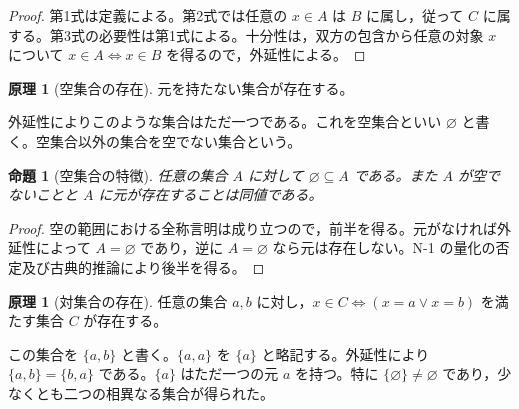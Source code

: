 \documentclass[a5paper,10pt,dvipdfmx]{jsarticle}
\theoremstyle{definition}
\newtheorem{principle}[ruledef]{原理}
\theoremstyle{plain}
\newtheorem{prop}[ruledef]{命題}
\newcommand{\iffc}{\Longleftrightarrow}
\begin{document}
\begin{proof}
第1式は定義による。第2式では任意の $x\in A$ は $B$ に属し，従って $C$ に属する。第3式の必要性は第1式による。十分性は，双方の包含から任意の対象 $x$ について $x\in A\iffc x\in B$ を得るので，外延性による。
\end{proof}
\begin{principle}[空集合の存在]\label{k21}
元を持たない集合が存在する。
\end{principle}
外延性によりこのような集合はただ一つである。これを空集合といい $\varnothing$ と書く。空集合以外の集合を空でない集合という。
\begin{prop}[空集合の特徴]\label{k22}
任意の集合 $A$ に対して $\varnothing\subseteq A$ である。また $A$ が空でないことと $A$ に元が存在することは同値である。
\end{prop}
\begin{proof}
空の範囲における全称言明は成り立つので，前半を得る。元がなければ外延性によって $A=\varnothing$ であり，逆に $A=\varnothing$ なら元は存在しない。N-1 の量化の否定及び古典的推論により後半を得る。
\end{proof}
\begin{principle}[対集合の存在]\label{k23}
任意の集合 $a,b$ に対し，$x\in C\iffc (x=a\lor x=b)$ を満たす集合 $C$ が存在する。
\end{principle}
この集合を $\{a,b\}$ と書く。$\{a,a\}$ を $\{a\}$ と略記する。外延性により $\{a,b\}=\{b,a\}$ である。$\{a\}$ はただ一つの元 $a$ を持つ。特に $\{\varnothing\}\ne\varnothing$ であり，少なくとも二つの相異なる集合が得られた。
\end{document}

